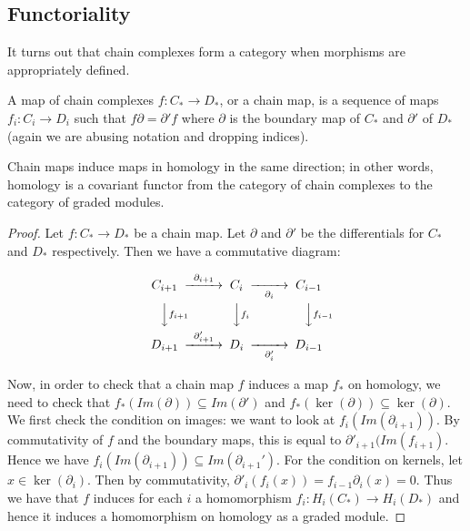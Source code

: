 \subsection{Functoriality}
It turns out that chain complexes form a category when morphisms
are appropriately defined.
\begin{definition} A map of chain complexes $f:C_*\rightarrow
D_*$, or a chain map, is a sequence of maps $f_i:C_i\rightarrow
D_i$ such that $f\partial = \partial' f$ where $\partial$ is the
boundary map of $C_*$ and $\partial'$ of $D_*$ (again we are
abusing notation and dropping indices). \end{definition}
\begin{theorem} Chain maps induce maps in homology in the same
direction; in other words, homology is a covariant functor from
the category of chain complexes to the category of graded
modules.\end{theorem}
\begin{proof}
Let $f:C_*\rightarrow D_*$ be a chain map. Let $\partial$ and
$\partial'$ be the differentials for $C_*$ and $D_*$
respectively. Then we have a commutative diagram:

\begin{equation}
\begin{CD}
C_{i+1} @>\partial_{i+1}>> C_i @>>\partial_i> C_{i-1}\\
@VV f_{i+1} V          @VV f_i V             @VVf_{i-1} V\\
D_{i+1} @>\partial'_{i+1}>> D_i @>>\partial'_i> D_{i-1}
\end{CD}
\end{equation}

Now, in order to check that a chain map $f$ induces a map $f_*$
on homology, we need to check that $f_*(Im(\partial))\subseteq
Im(\partial')$ and $f_*(\ker(\partial))\subseteq
\ker(\partial)$. We first check the condition on images: we want
to look at $f_i(Im(\partial_{i+1}))$. By commutativity of $f$
and the boundary maps, this is equal to
$\partial'_{i+1}(Im(f_{i+1})$. Hence we have
$f_i(Im(\partial_{i+1}))\subseteq Im(\partial_{i+1}')$. For the
condition on kernels, let $x\in \ker(\partial_i)$. Then by
commutativity, $\partial'_i(f_i(x))=f_{i-1}\partial_i(x)=0$.
Thus we have that $f$ induces for each $i$ a homomorphism
$f_i:H_i(C_*)\rightarrow H_i(D_*)$ and hence it induces a
homomorphism on homology as a graded module. \end{proof}

